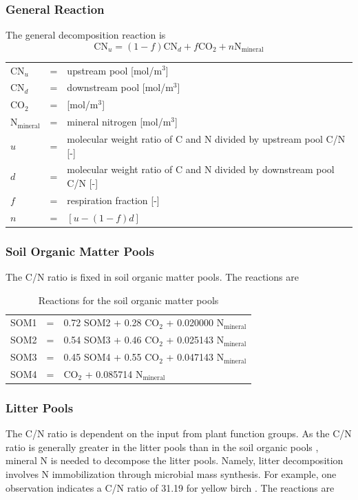 \documentclass[12pt, a4paper]{article}
\begin{document}
\subsubsection{General Reaction}
The general decomposition reaction is
\begin{equation}
\label{rxnclmcn}
\text{CN}_u = (1 - f) \text{CN}_d + f \text{CO}_2 + n \text{N}_\text{mineral}
\end{equation}

\begin{tabular}{lll}
$\text{CN}_u$ & = & upstream pool [mol/m$^3$] \\
$\text{CN}_d$ & = & downstream pool [mol/m$^3$] \\
$\text{CO}_2$ & = & [mol/m$^3$] \\
$\text{N}_\text{mineral}$ & = &mineral nitrogen [mol/m$^3$] \\
$u$ & = & molecular weight ratio of C and N divided by upstream pool C/N [-]\\
$d$ & = & molecular weight ratio of C and N divided by downstream pool C/N [-]\\
$f$ & = & respiration fraction [-] \\
$n$ & = & $[u - (1 - f)d]$
\end{tabular}

\subsubsection{Soil Organic Matter Pools}
The C/N ratio is fixed in soil organic matter pools. The reactions are

\begin{table}[h]
\caption{Reactions for the soil organic matter pools}
\begin{center}
\begin{tabular}{lll}
SOM1 & = & 0.72 SOM2 + 0.28 $\text{CO}_2$ + 0.020000 $\text{N}_ \text{mineral}$ \\
SOM2 & = & 0.54 SOM3 + 0.46 $\text{CO}_2$ + 0.025143 $\text{N}_\text{mineral}$  \\
SOM3 & = & 0.45 SOM4 + 0.55 $\text{CO}_2$ + 0.047143 $\text{N}_ \text{mineral}$ \\
SOM4 & = & $\text{CO}_2$ + 0.085714 $\text{N}_\text{mineral}$  
\end{tabular}
\end{center}
\label{SOMReactions}
\end{table}

\subsubsection{Litter Pools}
The C/N ratio is dependent on the input from plant function groups. As the C/N ratio is generally greater in the litter pools than in the soil organic pools \cite{Adairetal2008}, mineral N is needed to decompose the litter pools. Namely, litter decomposition involves N immobilization through microbial mass synthesis. For example, one observation indicates a C/N ratio of 31.19 for yellow birch \cite{Adairetal2008}. The reactions are
\end{document}
